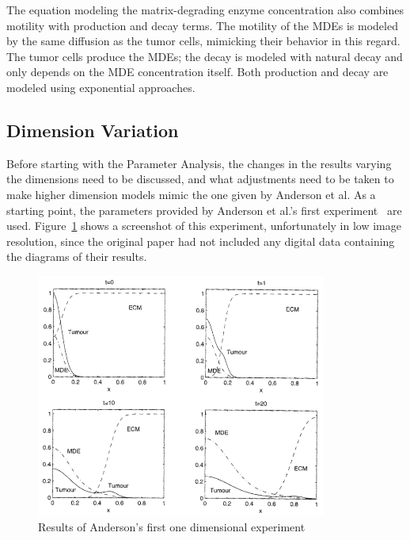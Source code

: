 The equation modeling the matrix-degrading enzyme concentration also combines motility with production and decay terms. The motility of the MDEs is modeled by the same diffusion as the tumor cells, mimicking their behavior in this regard. The tumor cells produce the MDEs; the decay is modeled with natural decay and only depends on the MDE concentration itself. Both production and decay are modeled using exponential approaches.

\subsection{Dimension Variation}
Before starting with the Parameter Analysis, the changes in the results varying the dimensions need to be discussed, and what adjustments need to be taken to make higher dimension models mimic the one given by Anderson et al. As a starting point, the parameters provided by Anderson et al.'s first experiment~\cite{anderson_mathematical_2000} are used. Figure~\ref{fig:anderson_experiment} shows a screenshot of this experiment, unfortunately in low image resolution, since the original paper had not included any digital data containing the diagrams of their results.
\begin{figure}[ht!]
 \centering
 \includegraphics[width=0.85\textwidth]{resources/images/anderson_experiment.png}
 \caption{Results of Anderson's first one dimensional experiment}
 \label{fig:anderson_experiment}
\end{figure}
